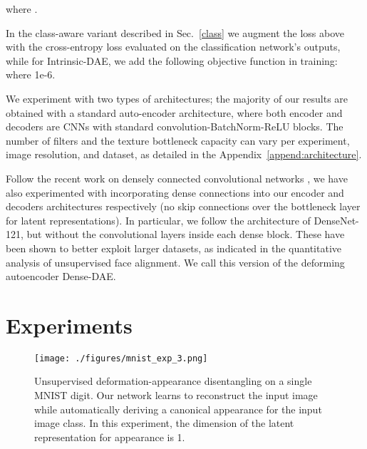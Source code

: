 \documentclass[runningheads]{llncs}
\begin{document}
where . 



In the class-aware variant described in Sec.~\ref{class} we augment the loss above with the cross-entropy loss evaluated on the classification network's outputs, while for Intrinsic-DAE, we add the following objective function in training:\\
\noindent  where 1e-6.

We experiment with two types of architectures; the majority of our results are obtained with a standard auto-encoder architecture, 
where both encoder and decoders are CNNs with standard convolution-BatchNorm-ReLU blocks. The number of filters and the texture bottleneck capacity can vary per experiment, image resolution, and dataset, as  detailed in the Appendix~\ref{append:architecture}. 

Follow the recent work on densely connected convolutional networks \cite{huang2017densely}, we have also experimented with incorporating dense connections into our encoder and decoders architectures respectively (no skip connections over the bottleneck layer for latent representations). In particular, we follow the architecture of DenseNet-121, but without the  convolutional layers inside each dense block. These have been shown to better exploit larger datasets, as indicated in the quantitative analysis of unsupervised face alignment. We call this version of the deforming autoencoder Dense-DAE.

\section{Experiments}



\begin{figure}
    \centering
    \texttt{[image: ./figures/mnist\_exp\_3.png]}
    \caption{Unsupervised deformation-appearance disentangling on a single MNIST digit. Our network learns to reconstruct the input image while automatically deriving a canonical appearance for the input image class. In this experiment, the dimension of the latent representation for appearance  is 1.}
    \label{fig:mnist_1}
\end{figure}
\end{document}
